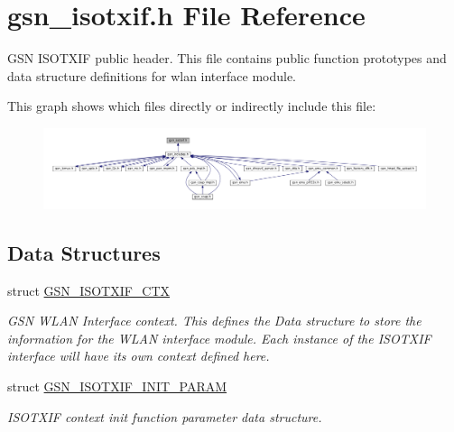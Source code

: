 \hypertarget{a00521}{
\section{gsn\_\-isotxif.h File Reference}
\label{a00521}
}


GSN ISOTXIF public header. This file contains public function prototypes and data structure definitions for wlan interface module.  


This graph shows which files directly or indirectly include this file:
\nopagebreak
\begin{figure}[H]
\begin{center}
\leavevmode
\includegraphics[width=400pt]{a00755}
\end{center}
\end{figure}
\subsection*{Data Structures}
\begin{DoxyCompactItemize}
\item 
struct \hyperlink{a00105}{GSN\_\-ISOTXIF\_\-CTX}
\begin{DoxyCompactList}\small\item\em GSN WLAN Interface context. This defines the Data structure to store the information for the WLAN interface module. Each instance of the ISOTXIF interface will have its own context defined here. \end{DoxyCompactList}\item 
struct \hyperlink{a00106}{GSN\_\-ISOTXIF\_\-INIT\_\-PARAM}
\begin{DoxyCompactList}\small\item\em ISOTXIF context init function parameter data structure. \end{DoxyCompactList}\end{DoxyCompactItemize}
